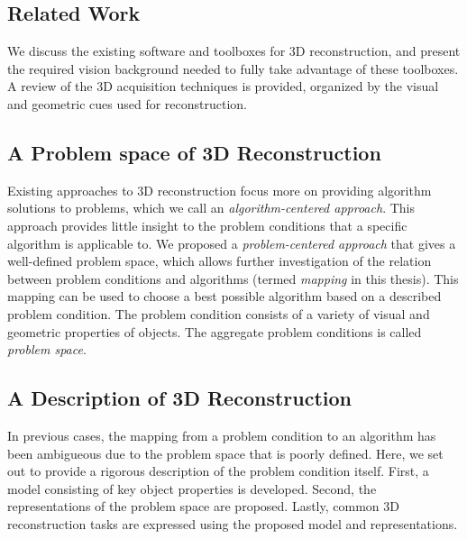 \subsection{Related Work}
We discuss the existing software and toolboxes for 3D reconstruction, and present the required vision background needed to fully take advantage of these toolboxes. A review of the 3D acquisition techniques is provided, organized by the visual and geometric cues used for reconstruction.

\subsection{A Problem space of 3D Reconstruction}
Existing approaches to 3D reconstruction focus more on providing algorithm solutions to problems, which we call an \textit{algorithm-centered approach}. This approach provides little insight to the problem conditions that a specific algorithm is applicable to. We proposed a \textit{problem-centered approach} that gives a well-defined problem space, which allows further investigation of the relation between problem conditions and algorithms (termed \textit{mapping} in this thesis). This mapping can be used to choose a best possible algorithm based on a described problem condition. The problem condition consists of a variety of visual and geometric properties of objects. The aggregate problem conditions is called \textit{problem space}.

\subsection{A Description of 3D Reconstruction}
In previous cases, the mapping from a problem condition to an algorithm has been ambigueous due to the problem space that is poorly defined. Here, we set out to provide a rigorous description of the problem condition itself. First, a model consisting of key object properties is developed. Second, the representations of the problem space are proposed. Lastly, common 3D reconstruction tasks are expressed using the proposed model and representations.


